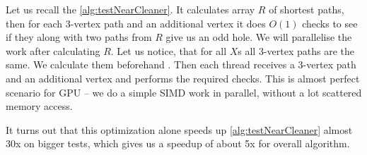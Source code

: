 Let us recall the \cref{alg:testNearCleaner}. It calculates array $R$ of shortest paths, then for each 3-vertex path and an additional vertex it does $O(1)$ checks to see if they along with two paths from $R$ give us an odd hole. We will parallelise the work after calculating $R$. Let us notice, that for all $X$s all 3-vertex paths are the same. We calculate them beforehand  . Then each thread receives a 3-vertex path and an additional vertex and performs the required checks. This is almost perfect scenario for GPU -- we do a simple SIMD work in parallel, without a lot scattered memory access.

It turns out that this optimization alone speeds up \cref{alg:testNearCleaner} almost 30x  on bigger tests, which gives us a speedup of about 5x  for overall algorithm.



